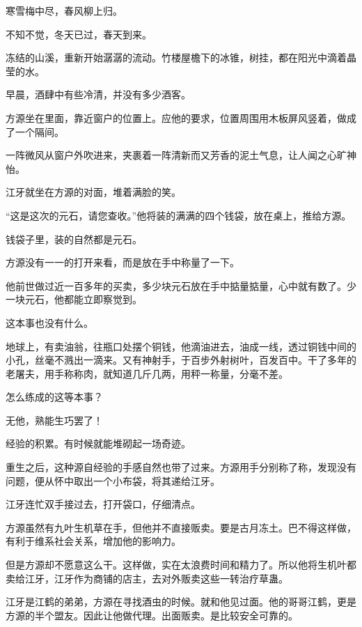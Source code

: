 
\begin{this_body}

寒雪梅中尽，春风柳上归。

不知不觉，冬天已过，春天到来。

冻结的山溪，重新开始潺潺的流动。竹楼屋檐下的冰锥，树挂，都在阳光中滴着晶莹的水。

早晨，酒肆中有些冷清，并没有多少酒客。

方源坐在里面，靠近窗户的位置上。应他的要求，位置周围用木板屏风竖着，做成了一个隔间。

一阵微风从窗户外吹进来，夹裹着一阵清新而又芳香的泥土气息，让人闻之心旷神怡。

江牙就坐在方源的对面，堆着满脸的笑。

“这是这次的元石，请您查收。”他将装的满满的四个钱袋，放在桌上，推给方源。

钱袋子里，装的自然都是元石。

方源没有一一的打开来看，而是放在手中称量了一下。

他前世做过近一百多年的买卖，多少块元石放在手中掂量掂量，心中就有数了。少一块元石，他都能立即察觉到。

这本事也没有什么。

地球上，有卖油翁，往瓶口处摆个铜钱，他滴油进去，油成一线，透过铜钱中间的小孔，丝毫不溅出一滴来。又有神射手，于百步外射树叶，百发百中。干了多年的老屠夫，用手称称肉，就知道几斤几两，用秤一称量，分毫不差。

怎么练成的这等本事？

无他，熟能生巧罢了！

经验的积累。有时候就能堆砌起一场奇迹。

重生之后，这种源自经验的手感自然也带了过来。方源用手分别称了称，发现没有问题，便从怀中取出一个小布袋，将其递给江牙。

江牙连忙双手接过去，打开袋口，仔细清点。

方源虽然有九叶生机草在手，但他并不直接贩卖。要是古月冻土。巴不得这样做，有利于维系社会关系，增加他的影响力。

但是方源却不愿意这么干。这样做，实在太浪费时间和精力了。所以他将生机叶都卖给江牙，江牙作为商铺的店主，去对外贩卖这些一转治疗草蛊。

江牙是江鹤的弟弟，方源在寻找酒虫的时候。就和他见过面。他的哥哥江鹤，更是方源的半个盟友。因此让他做代理。出面贩卖。是比较安全可靠的。


\end{this_body}
